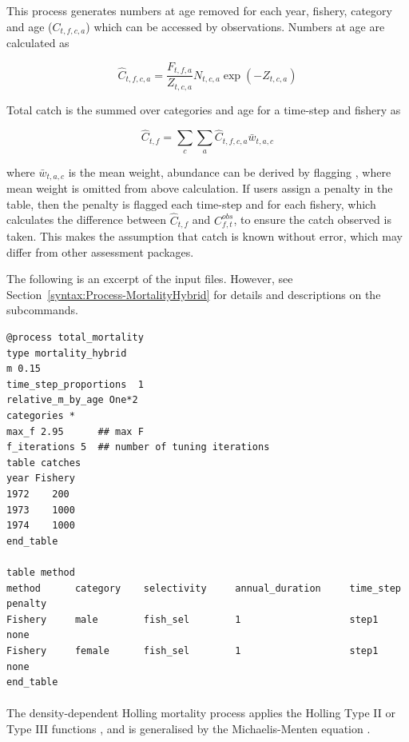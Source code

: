 This process generates numbers at age removed for each year, fishery, category and age (\(C_{t,f,c,a}\)) which can be accessed by  observations. Numbers at age are calculated as

\[
\widehat{C}_{t,f,c,a} = \frac{F_{t,f,a}}{Z_{t,c,a}} N_{t,c,a} \exp\left(-Z_{t,c,a}\right)
\]

Total catch is the summed over categories and age for a time-step and fishery as

\[
\widehat{C}_{t,f} = \sum\limits_c\sum\limits_a \widehat{C}_{t,f,c,a} \bar{w}_{t,a,c}
\]

where \(\bar{w}_{t,a,c}\) is the mean weight, abundance can be derived by flagging , where mean weight is omitted from above calculation. If users assign a penalty in the  table, then the penalty is flagged each time-step and for each fishery, which calculates the difference between \(\widehat{C}_{t,f}\) and \(C^{obs}_{f,t}\), to ensure the catch observed is taken. This makes the assumption that catch is known without error, which may differ from other assessment packages.

The following is an excerpt of the input files. However, see Section~\ref{syntax:Process-MortalityHybrid} for details and descriptions on the subcommands.

{\small{\begin{verbatim}
@process total_mortality
type mortality_hybrid
m 0.15
time_step_proportions  1 
relative_m_by_age One*2
categories *
max_f 2.95		## max F
f_iterations 5  ## number of tuning iterations
table catches
year Fishery
1972	200
1973	1000
1974	1000
end_table

table method
method  	category 	selectivity 	annual_duration 	time_step  penalty	
Fishery   	male   		fish_sel 		1					step1 		none
Fishery  	female   	fish_sel 		1 					step1 		none	
end_table
\end{verbatim}}}

\paragraph{}\label{sec:Process-MortalityHollingRate} 

The density-dependent Holling mortality process applies the Holling Type II or Type III functions \citep{Holling1959}, and is generalised by the Michaelis-Menten equation \citep{MentenMichaelis1913}.

